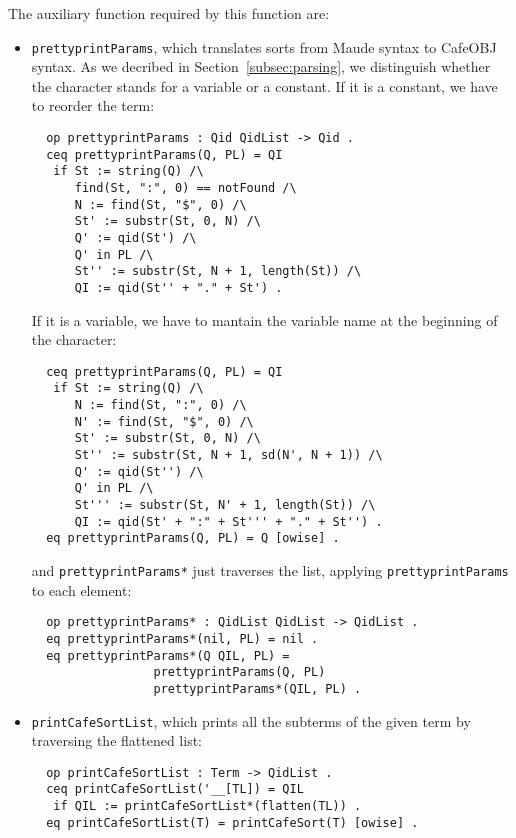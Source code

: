 The auxiliary function required by this function are:
\begin{itemize}
\item
\verb"prettyprintParams", which translates sorts from Maude syntax
to CafeOBJ syntax. As we decribed in Section~\ref{subsec:parsing}, we distinguish
whether the character stands for a variable or a constant. If it is a constant, we
have to reorder the term:

{\codesize
\begin{verbatim}
  op prettyprintParams : Qid QidList -> Qid .
  ceq prettyprintParams(Q, PL) = QI
   if St := string(Q) /\
      find(St, ":", 0) == notFound /\
      N := find(St, "$", 0) /\
      St' := substr(St, 0, N) /\
      Q' := qid(St') /\
      Q' in PL /\
      St'' := substr(St, N + 1, length(St)) /\
      QI := qid(St'' + "." + St') .
\end{verbatim}
}

If it is a variable, we have to mantain the variable name at the beginning of
the character:

{\codesize
\begin{verbatim}
  ceq prettyprintParams(Q, PL) = QI
   if St := string(Q) /\
      N := find(St, ":", 0) /\
      N' := find(St, "$", 0) /\
      St' := substr(St, 0, N) /\
      St'' := substr(St, N + 1, sd(N', N + 1)) /\
      Q' := qid(St'') /\
      Q' in PL /\
      St''' := substr(St, N' + 1, length(St)) /\
      QI := qid(St' + ":" + St''' + "." + St'') .
  eq prettyprintParams(Q, PL) = Q [owise] .
\end{verbatim}
}

\noindent
and \verb"prettyprintParams*" just traverses the list, applying
\texttt{prettyprintParams} to each element:

{\codesize
\begin{verbatim}
  op prettyprintParams* : QidList QidList -> QidList .
  eq prettyprintParams*(nil, PL) = nil .
  eq prettyprintParams*(Q QIL, PL) =
                 prettyprintParams(Q, PL)
                 prettyprintParams*(QIL, PL) .
\end{verbatim}
}

\item
\verb"printCafeSortList", which prints all the subterms of the given term by
traversing the flattened list:

{\codesize
\begin{verbatim}
  op printCafeSortList : Term -> QidList .
  ceq printCafeSortList('__[TL]) = QIL
   if QIL := printCafeSortList*(flatten(TL)) .
  eq printCafeSortList(T) = printCafeSort(T) [owise] .
\end{verbatim}
}


\end{itemize}
